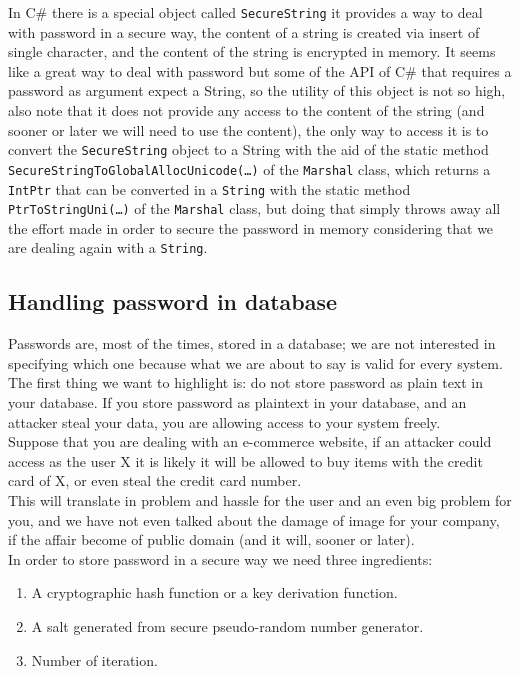 In C\# there is a special object called \texttt{SecureString} it provides a way to deal with password in a secure way, the content of a string is created via insert of single character, and the content of the string is encrypted in memory.\newline
It seems like a great way to deal with password but some of the API of C\# that requires a password as argument expect a String, so the utility of this object is not so high, also note that it does not provide any access to the content of the string (and sooner or later we will need to use the content), the only way to access it is to convert the \texttt{SecureString} object to a String with the aid of the static method \texttt{SecureStringToGlobalAllocUnicode(…)} of the \texttt{Marshal} class, which returns a \texttt{IntPtr} that can be converted in a \texttt{String} with the static method \texttt{PtrToStringUni(…)} of the \texttt{Marshal} class, but doing that simply throws away all the effort made in order to secure the password in memory considering that we are dealing again with a \texttt{String}.\newline

\subsection{Handling password in database}
Passwords are, most of the times, stored in a database; we are not interested in specifying which one because what we are about to say is valid for every system.\newline
The first thing we want to highlight is: do not store password as plain text in your database.\newline
If you store password as plaintext in your database, and an attacker steal your data, you are allowing access to your system freely.\\

Suppose that you are dealing with an e-commerce website, if an attacker could access as the user X it is likely it will be allowed to buy items with the credit card of X, or even steal the credit card number.\\
This will translate in problem and hassle for the user and an even big problem for you, and we have not even talked about the damage of image for your company, if the affair become of public domain (and it will, sooner or later).\\
In order to store password in a secure way we need three ingredients:
\begin{enumerate}
	\item A cryptographic hash function or a key derivation function.
	\item A salt generated from secure pseudo-random number generator.
	\item Number of iteration.
\end{enumerate}

